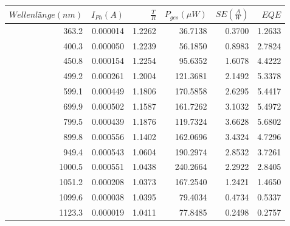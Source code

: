\begin{center}
\begin{tabular}{rrrrrr}
    $Wellenlänge (nm)$ &  $I_{Ph} (A)$ &    $\frac{T}{R}$ &  $P_{ges} (\mu W)$ &  $SE (\frac{A}{W})$ &       $EQE$ \\
    \hline
    363.2 &  0.000014 &  1.2262 &   36.7138 &  0.3700 &   1.2633 \\
    400.3 &  0.000050 &  1.2239 &   56.1850 &  0.8983 &   2.7824 \\
    450.8 &  0.000154 &  1.2254 &   95.6352 &  1.6078 &   4.4222 \\
    499.2 &  0.000261 &  1.2004 &  121.3681 &  2.1492 &   5.3378 \\
    599.1 &  0.000449 &  1.1806 &  170.5858 &  2.6295 &   5.4417 \\
    699.9 &  0.000502 &  1.1587 &  161.7262 &  3.1032 &   5.4972 \\
    799.5 &  0.000439 &  1.1876 &  119.7324 &  3.6628 &   5.6802 \\
    899.8 &  0.000556 &  1.1402 &  162.0696 &  3.4324 &   4.7296 \\
    949.4 &  0.000543 &  1.0604 &  190.2974 &  2.8532 &   3.7261 \\
    1000.5 &  0.000551 &  1.0438 &  240.2664 &  2.2922 &   2.8405 \\
    1051.2 &  0.000208 &  1.0373 &  167.2540 &  1.2421 &   1.4650 \\
    1099.6 &  0.000038 &  1.0395 &   79.4034 &  0.4734 &  0.5337 \\
    1123.3 &  0.000019 &  1.0411 &   77.8485 &  0.2498 &  0.2757 \\
\end{tabular}
\label{tab:32multi}
\end{center}

